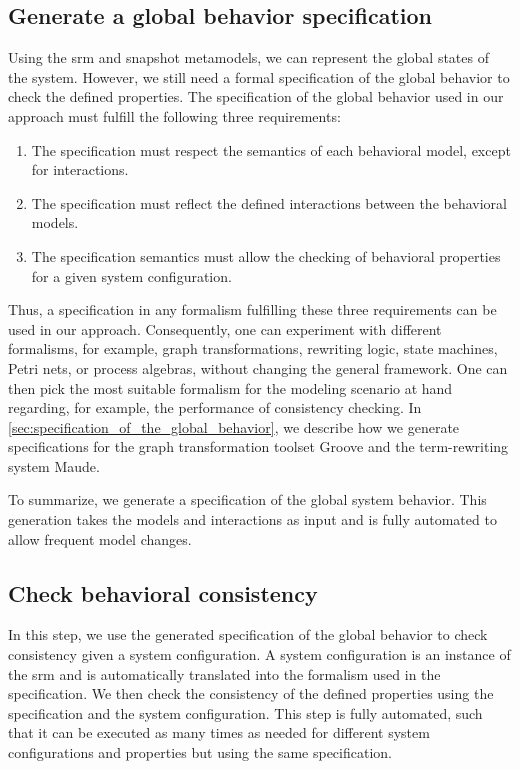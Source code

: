 \documentclass{jot}
\begin{document}
\subsection{Generate a global behavior specification}
Using the \gls*{srm} and snapshot metamodels, we can represent the global states of the system.
However, we still need a formal specification of the global behavior to check the defined properties.
The specification of the global behavior used in our approach must fulfill the following three requirements:
\begin{enumerate}
    \item The specification must respect the semantics of each behavioral model, except for interactions.
    \item The specification must reflect the defined interactions between the behavioral models.
    \item The specification semantics must allow the checking of behavioral properties for a given system configuration.
\end{enumerate}
Thus, a specification in any formalism fulfilling these three requirements can be used in our approach.
Consequently, one can experiment with different formalisms, for example, graph transformations, rewriting logic, state machines, Petri nets, or process algebras, without changing the general framework.
One can then pick the most suitable formalism for the modeling scenario at hand regarding, for example, the performance of consistency checking.
In \cref{sec:specification_of_the_global_behavior}, we describe how we generate specifications for the graph transformation toolset Groove and the term-rewriting system Maude.

To summarize, we generate a specification of the global system behavior.
This generation takes the models and interactions as input and is fully automated to allow frequent model changes.


\subsection{Check behavioral consistency}
In this step, we use the generated specification of the global behavior to check consistency given a system configuration.
A system configuration is an instance of the \gls*{srm} and is automatically translated into the formalism used in the specification.
We then check the consistency of the defined properties using the specification and the system configuration.
This step is fully automated, such that it can be executed as many times as needed for different system configurations and properties but using the same specification.
\end{document}
